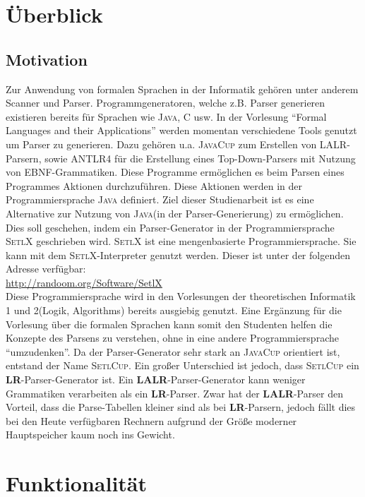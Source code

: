 \section{Überblick}
\subsection{Motivation}
Zur Anwendung von formalen Sprachen in der Informatik gehören unter anderem Scanner und Parser\cite{Aho86}. 
Programmgeneratoren, welche z.B. Parser generieren existieren bereits für Sprachen wie \textsc{Java}\cite{javacup:2016}, \textsc{C}\cite{donnelly2015} usw.
In der Vorlesung "`Formal Languages and their Applications"'\cite{stroetmann:formallanguages} werden momentan verschiedene Tools genutzt um Parser zu generieren. Dazu gehören u.a. \textsc{JavaCup} zum Erstellen von LALR-Parsern, sowie \textsc{ANTLR4}\cite{parr:2012} für die Erstellung eines Top-Down-Parsers mit Nutzung von EBNF-Grammatiken. Diese Programme ermöglichen es  beim Parsen eines Programmes Aktionen durchzuführen. Diese Aktionen werden in der Programmiersprache \textsc{Java} definiert.
Ziel dieser Studienarbeit ist es eine Alternative zur Nutzung von \textsc{Java}(in der Parser-Generierung) zu ermöglichen. Dies soll geschehen, indem ein Parser-Generator in der Programmiersprache \textsc{SetlX} geschrieben wird. \textsc{SetlX} ist eine mengenbasierte Programmiersprache. Sie kann mit dem \textsc{SetlX}-Interpreter genutzt werden. Dieser ist unter der folgenden Adresse verfügbar:\\
\href{http://randoom.org/Software/SetlX}{{http://randoom.org/Software/SetlX}}\\
Diese Programmiersprache wird in den Vorlesungen der theoretischen Informatik 1 und 2(Logik\cite{stroetmann:logic}, Algorithms\cite{stroetmann:algorithms}) bereits ausgiebig genutzt. Eine Ergänzung für die Vorlesung über die formalen Sprachen kann somit den Studenten helfen die Konzepte des Parsens zu verstehen, ohne in eine andere Programmiersprache "`umzudenken"'. Da der Parser-Generator sehr stark an \textsc{JavaCup} orientiert ist, entstand der Name \textsc{SetlCup}. Ein großer Unterschied ist jedoch, dass \textsc{SetlCup} ein \textbf{LR}-Parser-Generator ist. Ein \textbf{LALR}-Parser-Generator kann weniger Grammatiken verarbeiten als ein \textbf{LR}-Parser. Zwar hat der \textbf{LALR}-Parser den Vorteil, dass die Parse-Tabellen kleiner sind als bei \textbf{LR}-Parsern, jedoch fällt dies bei den Heute verfügbaren Rechnern aufgrund der Größe moderner Hauptspeicher kaum noch ins Gewicht.
\section{Funktionalität}
